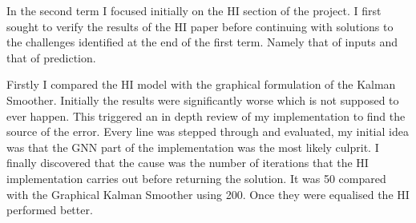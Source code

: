 \documentclass[]{../resources/final_report}
\begin{document}





In the second term I focused initially on the HI section of the project. I first sought to 
verify the results of the HI paper before continuing with solutions to the challenges identified 
at the end of the first term. Namely that of inputs and that of prediction.

Firstly I compared the HI model with the graphical formulation of the Kalman Smoother.
Initially the results were significantly worse which is not supposed to ever happen.
This triggered an in depth review of my implementation to find the source of the error.
Every line was stepped through and evaluated, my initial idea was that the GNN part 
of the implementation was the most likely culprit. I finally discovered that the cause 
was the number of iterations that the HI implementation carries out before returning the 
solution. It was 50 compared with the Graphical Kalman Smoother using 200. Once they were
equalised the HI performed better.

\end{document}
